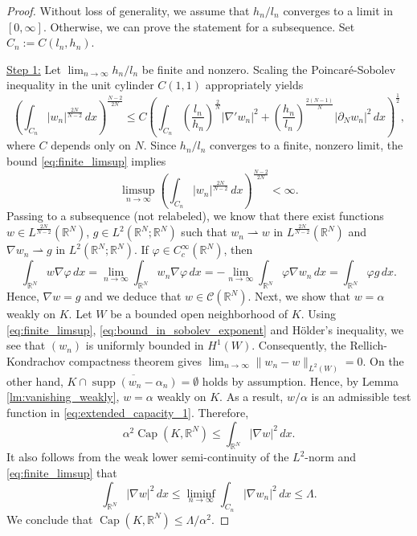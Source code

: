 \documentclass{article}
\numberwithin{equation}{section}
\theoremstyle{definition}
\theoremstyle{remark}
\newcommand{\cpct}{\operatorname{Cap}}
\newcommand{\supp}{\operatorname{supp}}
\begin{document}
\begin{proof}
    Without loss of generality, we assume that $h_n/l_n$ converges to a limit in $[0, \infty]$. Otherwise, we can prove the statement for a subsequence. Set $C_n := C(l_n, h_n)$.

    \underline{Step 1:} Let $\lim_{n \to \infty} h_n/l_n$ be finite and nonzero. Scaling the Poincaré-Sobolev inequality in the unit cylinder $C(1, 1)$ appropriately yields
    \begin{equation} \label{eq:poincaré_sobolev}
        \left(\int_{C_n} |w_n|^{\frac{2N}{N - 2}} \, dx\right)^\frac{N - 2}{2N} \le C \left(\int_{C_n} \left(\frac{l_n}{h_n}\right)^\frac{2}{N}|\nabla' w_n|^2 +  \left(\frac{h_n}{l_n}\right)^\frac{2(N - 1)}{N} |\partial_N w_n|^2 \, dx\right)^\frac{1}{2},
    \end{equation}
    where $C$ depends only on $N$. Since $h_n/l_n$ converges to a finite, nonzero limit, the bound \eqref{eq:finite_limsup} implies
    \begin{equation} \label{eq:bound_in_sobolev_exponent}
        \limsup_{n \to \infty} \left(\int_{C_n} |w_n|^{\frac{2N}{N - 2}} \, dx\right)^\frac{N - 2}{2N} < \infty.
    \end{equation}
    Passing to a subsequence (not relabeled), we know that there exist functions $w \in L^\frac{2N}{N - 2}(\mathbb{R}^N)$, $g \in L^2(\mathbb{R}^N; \mathbb{R}^N)$ such that $w_n \rightharpoonup w$ in $L^\frac{2N}{N - 2}(\mathbb{R}^N)$ and $\nabla w_n \rightharpoonup g$ in $L^2(\mathbb{R}^N; \mathbb{R}^N)$. If $\varphi \in C_c^\infty(\mathbb{R}^N)$, then
    \[
    \int_{\mathbb{R}^N} w \nabla \varphi \, dx = \lim_{n \to \infty} \int_{\mathbb{R}^N} w_n \nabla \varphi \, dx = -\lim_{n \to \infty} \int_{\mathbb{R}^N} \varphi \nabla w_n \, dx = \int_{\mathbb{R}^N} \varphi g \, dx.
    \]
    Hence, $\nabla w = g$ and we deduce that $w \in \mathcal{C}(\mathbb{R}^N)$. Next, we show that $w = \alpha$ weakly on $K$. Let $W$ be a bounded open neighborhood of $K$. Using \eqref{eq:finite_limsup}, \eqref{eq:bound_in_sobolev_exponent} and Hölder's inequality, we see that $(w_n)$ is uniformly bounded in $H^1(W)$. Consequently, the Rellich-Kondrachov compactness theorem gives $\lim_{n \to \infty} \|w_n - w\|_{L^2(W)} = 0$. On the other hand, $K \cap \overline{\supp(w_n - \alpha_n)} = \emptyset$ holds by assumption. Hence, by Lemma \ref{lm:vanishing_weakly}, $w = \alpha$ weakly on $K$. As a result, $w/\alpha$ is an admissible test function in \eqref{eq:extended_capacity_1}. Therefore,
    \[
    \alpha^2 \cpct(K, \mathbb{R}^N) \le \int_{\mathbb{R}^N} |\nabla w|^2 \, dx.
    \]
    It also follows from the weak lower semi-continuity of the $L^2$-norm and \eqref{eq:finite_limsup} that
    \[
    \int_{\mathbb{R}^N} |\nabla w|^2 \, dx \le \liminf_{n \to \infty} \int_{C_n} |\nabla w_n|^2 \, dx \le \Lambda.
    \]
    We conclude that $\cpct(K, \mathbb{R}^N) \le \Lambda/\alpha^2$.


\end{proof}
\end{document}
